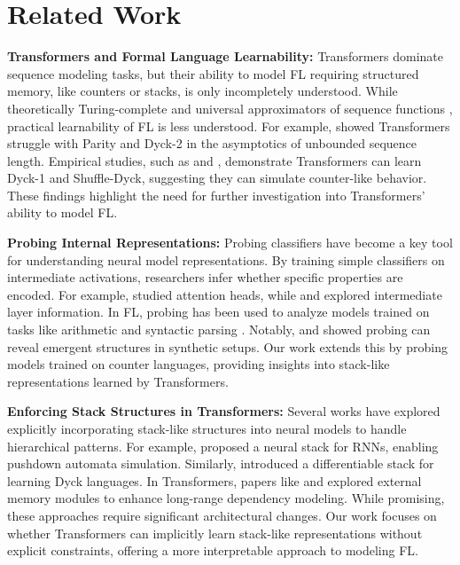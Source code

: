 \section{Related Work}
\textbf{Transformers and Formal Language Learnability:}
Transformers dominate sequence modeling tasks, but their ability to model FL requiring structured memory, like counters or stacks, is only incompletely understood. While theoretically Turing-complete \citep{pérez2019turingcompletenessmodernneural} and universal approximators of sequence functions \citep{yun2020transformersuniversalapproximatorssequencetosequence}, practical learnability of FL is less understood. For example, \citet{hahn-2020-theoretical} showed Transformers struggle with Parity and Dyck-2 in the asymptotics of unbounded sequence length. Empirical studies, such as \citet{Bhattamishra2020OnTA} and \cite{Strobl_2024}, demonstrate Transformers can learn Dyck-1 and Shuffle-Dyck, suggesting they can simulate counter-like behavior. These findings highlight the need for further investigation into Transformers' ability to model FL.

\textbf{Probing Internal Representations:}
Probing classifiers have become a key tool for understanding neural model representations. By training simple classifiers on intermediate activations, researchers infer whether specific properties are encoded. For example, \citet{voita2019analyzingattention} studied attention heads, while \citet{rogers2020primer} and \citet{coenen2019visualizingmeasuringgeometrybert} explored intermediate layer information. In FL, probing has been used to analyze models trained on tasks like arithmetic and syntactic parsing \citep{li-etal-2021-implicit, abdou-etal-2021-language}. Notably, \citet{elhage2022toymodelssuperposition} and \citet{li2024emergentworldrepresentationsexploring} showed probing can reveal emergent structures in synthetic setups. Our work extends this by probing models trained on counter languages, providing insights into stack-like representations learned by Transformers.

\textbf{Enforcing Stack Structures in Transformers:}
Several works have explored explicitly incorporating stack-like structures into neural models to handle hierarchical patterns. For example, \citet{stackrnn} proposed a neural stack for RNNs, enabling pushdown automata simulation. Similarly, \citet{suzgun2019memoryaugmentedrecurrentneuralnetworks} introduced a differentiable stack for learning Dyck languages. In Transformers, papers like \citet{transformerstack} and \citet{stackattention} explored external memory modules to enhance long-range dependency modeling. While promising, these approaches require significant architectural changes. Our work focuses on whether Transformers can implicitly learn stack-like representations without explicit constraints, offering a more interpretable approach to modeling FL.

